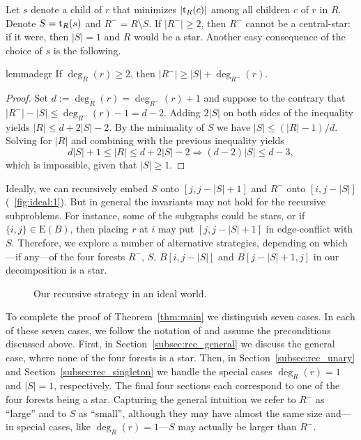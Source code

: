 \documentclass[11pt,a4paper,colorlinks=true,urlcolor=blue,citecolor=red]{article}
\theoremstyle{plain}
\newcommand{\EB}{\mathrm{E}(B)}
\begin{document}
Let $s$ denote a child of $r$ that minimizes $|\mathrm t_R(c)|$ among all
children $c$ of $r$ in $R$. Denote $S=\mathrm t_R(s)$ and $R^-=R\setminus S$.
If $|R^-|\ge 2$, then $R^-$ cannot be a central-star: if it were, then
$|S|=1$ and $R$ would be a star. Another easy consequence of the choice
of $s$ is the following.
\begin{restatable}{lemma}{degr}\label{lem:degr}
  If $\deg_R(r)\ge 2$, then $|R^-|\ge|S|+\deg_{R^-}(r)$.
\end{restatable}
\begin{proof}
  Set $d:=\deg_R(r)=\deg_{R^-}(r)+1$ and suppose to the contrary that
  $|R^-|-|S|\le\deg_{R^-}(r)-1=d-2$. Adding $2|S|$ on both sides of the
  inequality yields $|R|\le d+2|S|-2$. By the minimality of $S$ we have
  $|S|\le(|R|-1)/d$. Solving for $|R|$ and combining with the previous
  inequality yields
  \[
  d|S|+1\le |R|\le d+2|S|-2 \Longrightarrow (d-2)|S|\le d-3,
  \]
  which is impossible, given that $|S|\ge 1$.
\end{proof}


Ideally, we can recursively embed $S$ onto $[j,j-|S|+1]$ and $R^-$ onto
$[i,j-|S|]$ (\figurename~\ref{fig:ideal:1}).  But in general the
invariants may not hold for the recursive subproblems. For instance,
some of the subgraphs could be stars, or if $\{i,j\}\in\EB$, then
placing $r$ at $i$ may put $[j,j-|S|+1]$ in edge-conflict with
$S$. Therefore, we explore a number of alternative strategies, depending
on which---if any---of the four forests $R^-$, $S$, $B[i,j-|S|]$ and
$B[j-|S|+1,j]$ in our decomposition is a star.
\begin{figure}[htbp]
  \centering {}\hfil
  \hfil
  \caption{Our recursive strategy in an ideal world.\label{fig:ideal}}
\end{figure}


To complete the proof of Theorem~\ref{thm:main} we distinguish seven
cases. In each of these seven cases, we follow the notation of and
assume the preconditions discussed above. First, in
Section~\ref{subsec:rec_general} we discuss the general case, where none
of the four forests is a star. Then, in Section~\ref{subsec:rec_unary}
and Section~\ref{subsec:rec_singleton} we handle the special cases
$\deg_R(r)=1$ and $|S|=1$, respectively. The final four sections each
correspond to one of the four forests being a star. Capturing the
general intuition we refer to $R^-$ as ``large'' and to $S$ as
``small'', although they may have almost the same size and---in special
cases, like $\deg_R(r)=1$---$S$ may actually be larger than $R^-$.
\end{document}
